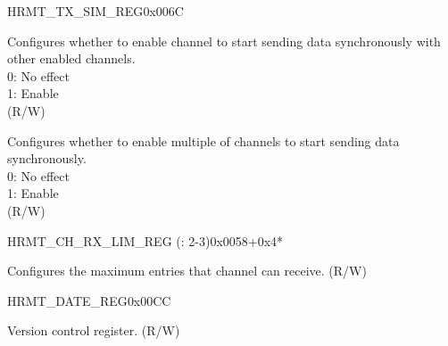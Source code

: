 \begin{register}{H}{RMT\_TX\_SIM\_REG}{0x006C}\label{regdesc:RMTTXSIMREG}
%
%
%
%
\regnewline%
\begin{regdesc}\begin{reglist}
\label{fielddesc:RMTTXSIMCHN}\item [RMT\_TX\_SIM\_CH\regindex{n}] Configures whether to enable channel  to start sending data synchronously with other enabled channels. \\
0: No effect\\
1: Enable\\
(R/W)
\label{fielddesc:RMTTXSIMEN}\item [RMT\_TX\_SIM\_EN] Configures whether to enable multiple of channels to start sending data synchronously. \\
0: No effect\\
1: Enable\\
(R/W)
\end{reglist}\end{regdesc}
\end{register}


\begin{register}{H}{RMT\_CH\_RX\_LIM\_REG (: 2-3)}{0x0058+0x4*}\label{regdesc:RMTCHMRXLIMREG}
%
%
\regnewline%
\begin{regdesc}\begin{reglist}
\label{fielddesc:RMTCHMRXLIMREG}\item [RMT\_CH\regindex{m}\_RX\_LIM\_REG] Configures the maximum entries that channel  can receive. (R/W)
\end{reglist}\end{regdesc}
\end{register}


\begin{register}{H}{RMT\_DATE\_REG}{0x00CC}\label{regdesc:RMTDATEREG}
%
%
\regnewline%
\begin{regdesc}\begin{reglist}
\label{fielddesc:RMTDATE}\item [RMT\_DATE] Version control register. (R/W)
\end{reglist}\end{regdesc}
\end{register}
